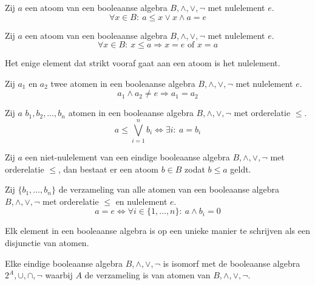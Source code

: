 \documentclass[main.tex]{subfiles}
\begin{document}
\begin{st}
  Zij $a$ een atoom van een booleaanse algebra $B,\wedge,\vee,\neg$ met nulelement $e$.
  \[ \forall x\in B:\ a \le x \vee x \wedge a = e \]
\end{st}

\begin{st}
  Zij $a$ een atoom van een booleaanse algebra $B,\wedge,\vee,\neg$ met nulelement $e$.
  \[ \forall x\in B:\ x \le a \Rightarrow x = e \text{ of } x = a \]
\end{st}

\begin{opm}
  Het enige element dat strikt vooraf gaat aan een atoom is het nulelement.
\end{opm}

\begin{st}
  Zij $a_{1}$ en $a_{2}$ twee atomen in een booleaanse algebra $B,\wedge,\vee,\neg$ met nulelement $e$.
  \[ a_{1} \wedge a_{2} \neq e \Rightarrow a_{1} = a_{2} \]
\end{st}

\begin{st}
  Zij $a$ $b_{1}, b_{2}, \dotsc, b_{n}$ atomen in een booleaanse algebra $B,\wedge,\vee,\neg$ met orderelatie $\le$.
  \[ a \le \bigvee_{i=1}^{n}b_{i} \Leftrightarrow \exists i:\ a = b_{i} \]
\end{st}

\begin{st}
  Zij $a$ een niet-nulelement van een eindige booleaanse algebra $B,\wedge,\vee,\neg$ met orderelatie $\le$, dan bestaat er een atoom $b\in B$ zodat $b\le a$ geldt.
\end{st}

\begin{st}
  Zij $\{ b_{1},\dots,b_{n}\}$ de verzameling van alle atomen van een booleaanse algebra $B,\wedge,\vee,\neg$ met orderelatie $\le$ en nulelement $e$.
  \[  a = e \Leftrightarrow \forall i \in \{ 1,\dotsc,n \}:\ a \wedge b_{i} = 0\]
\end{st}

\begin{st}
  Elk element in een booleaanse algebra is op een unieke manier te schrijven als een disjunctie van atomen.
\end{st}

\begin{st}
  Elke eindige booleaanse algebra $B,\wedge,\vee,\neg$ is isomorf met de booleaanse algebra $2^{A},\cup,\cap,\neg$ waarbij $A$ de verzameling is van atomen van $B,\wedge,\vee,\neg$.
\end{st}
\end{document}
